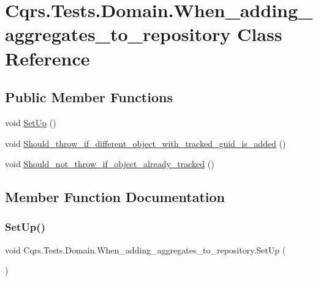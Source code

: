 \hypertarget{classCqrs_1_1Tests_1_1Domain_1_1When__adding__aggregates__to__repository}{}\section{Cqrs.\+Tests.\+Domain.\+When\+\_\+adding\+\_\+aggregates\+\_\+to\+\_\+repository Class Reference}
\label{classCqrs_1_1Tests_1_1Domain_1_1When__adding__aggregates__to__repository}
\subsection*{Public Member Functions}
\begin{DoxyCompactItemize}
\item 
void \hyperlink{classCqrs_1_1Tests_1_1Domain_1_1When__adding__aggregates__to__repository_a1a5d4bd19f137780df70bc6a4dae350c}{Set\+Up} ()
\item 
void \hyperlink{classCqrs_1_1Tests_1_1Domain_1_1When__adding__aggregates__to__repository_afc7613cfdd77c0dbbd1d3fb774a7ee3b}{Should\+\_\+throw\+\_\+if\+\_\+different\+\_\+object\+\_\+with\+\_\+tracked\+\_\+guid\+\_\+is\+\_\+added} ()
\item 
void \hyperlink{classCqrs_1_1Tests_1_1Domain_1_1When__adding__aggregates__to__repository_aeb6a64e97538f5385056ed2dfd1e3c9f}{Should\+\_\+not\+\_\+throw\+\_\+if\+\_\+object\+\_\+already\+\_\+tracked} ()
\end{DoxyCompactItemize}


\subsection{Member Function Documentation}
\mbox{\label{classCqrs_1_1Tests_1_1Domain_1_1When__adding__aggregates__to__repository_a1a5d4bd19f137780df70bc6a4dae350c}} 
\subsubsection{\texorpdfstring{Set\+Up()}{SetUp()}}
{\footnotesize\ttfamily void Cqrs.\+Tests.\+Domain.\+When\+\_\+adding\+\_\+aggregates\+\_\+to\+\_\+repository.\+Set\+Up (\begin{DoxyParamCaption}{ }\end{DoxyParamCaption})}

